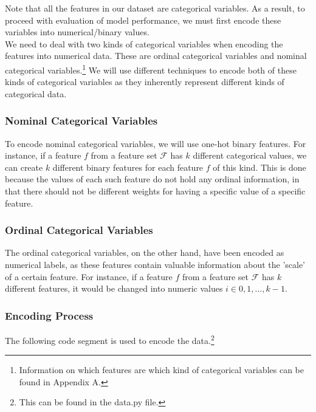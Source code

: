 \documentclass[fleqn]{article}
\begin{document}
    Note that all the features in our dataset are categorical variables. As a result, to
    proceed with evaluation of model performance, we must first encode these variables
    into numerical/binary values.\\

    We need to deal with two kinds of categorical variables when encoding the features
    into numerical data. These are ordinal categorical variables and nominal categorical
    variables.\footnote{Information on which features are which kind of categorical
    variables can be found in Appendix A.} We will use different techniques to encode
    both of these kinds of categorical variables as they inherently represent different
    kinds of categorical data.

    \subsubsection{Nominal Categorical Variables}

    To encode nominal categorical variables, we will use one-hot binary features. For
    instance, if a feature $ f $ from a feature set $ \mathcal{F} $ has $ k $ different
    categorical values, we can create $ k $ different binary features for each feature
    $ f $ of this kind. This is done because the values of each such feature do not hold
    any ordinal information, in that there should not be different weights for having a
    specific value of a specific feature.

    \subsubsection{Ordinal Categorical Variables}

    The ordinal categorical variables, on the other hand, have been encoded as numerical
    labels, as these features contain valuable information about the 'scale' of a
    certain feature. For instance, if a feature $ f $ from a feature set $ \mathcal{F} $
    has $ k $ different features, it would be changed into numeric values
    $ i \in 0,1,...,k-1$.

    \subsubsection{Encoding Process}

    The following code segment is used to encode the data.\footnote{This can be found in
    the data.py file.}
\end{document}
